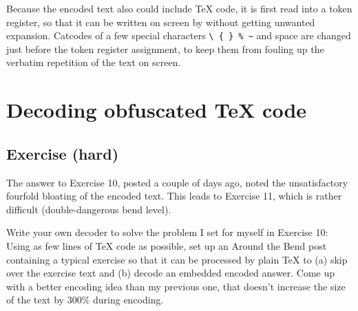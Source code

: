 Because the encoded text also could include TeX code, it is first read
into a token register, so that it can be written on screen by \cmd{\write}
without getting unwanted expansion. Catcodes of a few special
characters \verb?\ { } % ~? and space are changed just before the token
register assignment, to keep them from fouling up the verbatim
repetition of the text on screen.

\begin{comment}
Michael Downes %
mjd@math.ams.org (Internet) ASCII 32--54,55--126: !"#$%
789:;<=>?@ABCDEFGHIJKLMNOPQRSTUVWXYZ[\]^_`abcdefghijklmnopqrstuvwxyz{|}~
\end{comment}

\chapter{Decoding obfuscated TeX code}

\section{Exercise (hard)}

\begin{comment}
Date: 15 Sep 1993 16:34:45 -0400 (EDT)
From: Michael Downes <MJD@MATH.AMS.ORG>
Subject: Around the Bend #11
To: info-tex@shsu.edu
X-ListName: TeX-Related Network Discussion List <INFO-TeX@SHSU.edu>
\end{comment}


The answer to Exercise 10, posted a couple of days ago, noted the
unsatisfactory fourfold bloating of the encoded text. This leads to
Exercise 11, which is rather difficult (double-dangerous bend level).

Write your own decoder to solve the problem I set for myself in
Exercise 10: Using as few lines of TeX code as possible, set up an
Around the Bend post containing a typical exercise so that it can be
processed by plain TeX to (a) skip over the exercise text and (b)
decode an embedded encoded answer. Come up with a better encoding idea
than my previous one, that doesn't increase the size of the text by
300\% during encoding.



